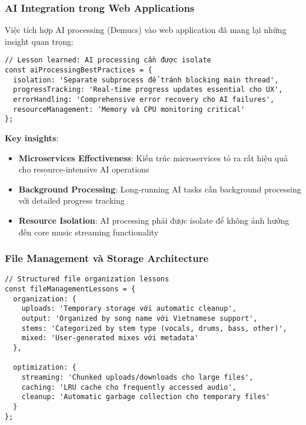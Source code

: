 \documentclass[12pt,a4paper]{article}
\begin{document}
\subsubsection{AI Integration trong Web Applications}

Việc tích hợp AI processing (Demucs) vào web application đã mang lại những insight quan trọng:

\begin{lstlisting}[caption={AI processing best practices}]
// Lesson learned: AI processing cần được isolate
const aiProcessingBestPractices = {
  isolation: 'Separate subprocess để tránh blocking main thread',
  progressTracking: 'Real-time progress updates essential cho UX',
  errorHandling: 'Comprehensive error recovery cho AI failures',
  resourceManagement: 'Memory và CPU monitoring critical'
};
\end{lstlisting}

\textbf{Key insights}:
\begin{itemize}
\item \textbf{Microservices Effectiveness}: Kiến trúc microservices tỏ ra rất hiệu quả cho resource-intensive AI operations
\item \textbf{Background Processing}: Long-running AI tasks cần background processing với detailed progress tracking
\item \textbf{Resource Isolation}: AI processing phải được isolate để không ảnh hưởng đến core music streaming functionality
\end{itemize}

\subsubsection{File Management và Storage Architecture}

\begin{lstlisting}[caption={Structured file organization lessons}]
// Structured file organization lessons
const fileManagementLessons = {
  organization: {
    uploads: 'Temporary storage với automatic cleanup',
    output: 'Organized by song name với Vietnamese support',
    stems: 'Categorized by stem type (vocals, drums, bass, other)',
    mixed: 'User-generated mixes với metadata'
  },
  
  optimization: {
    streaming: 'Chunked uploads/downloads cho large files',
    caching: 'LRU cache cho frequently accessed audio',
    cleanup: 'Automatic garbage collection cho temporary files'
  }
};
\end{lstlisting}
\end{document}
